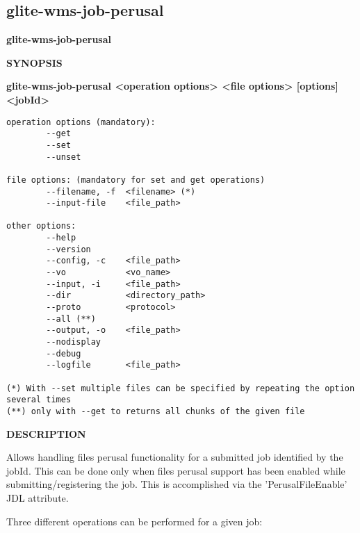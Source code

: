 
\subsection{glite-wms-job-perusal}
\label{glite-wms-job-perusal}

\medskip
\textbf{glite-wms-job-perusal}
\smallskip


\textbf{SYNOPSIS}
\smallskip

\textbf{glite-wms-job-perusal <operation options> <file options> [options] <jobId>}

\begin{verbatim}
operation options (mandatory):
        --get
        --set
        --unset

file options: (mandatory for set and get operations)
        --filename, -f  <filename> (*)
        --input-file    <file_path>

other options:
        --help
        --version
        --config, -c    <file_path>
        --vo            <vo_name>
        --input, -i     <file_path>
        --dir           <directory_path>
        --proto         <protocol>
        --all (**)
        --output, -o    <file_path>
        --nodisplay
        --debug
        --logfile       <file_path>

(*) With --set multiple files can be specified by repeating the option several times
(**) only with --get to returns all chunks of the given file
\end{verbatim}

\medskip
\textbf{DESCRIPTION}
\smallskip

Allows handling files perusal functionality for a submitted job identified by the jobId.
This can be done only when files perusal support has been enabled while submitting/registering the job.
This is accomplished via the 'PerusalFileEnable' JDL attribute.

Three different operations can be performed for a given job:


